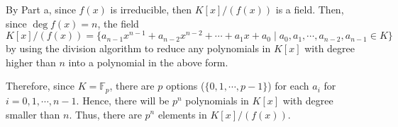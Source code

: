 \begin{answer}
    By Part a, since $f(x)$ is irreducible, then $K[x]/(f(x))$ is a field. Then, since $\deg f(x) = n$, the field
    \begin{equation}
        K[x]/(f(x)) = \{a_{n-1}x^{n-1}+a_{n-2}x^{n-2}+\cdots+a_1x+a_0 \mid a_0,a_1,\cdots,a_{n-2},a_{n-1} \in K\}
    \end{equation}
    by using the division algorithm to reduce any polynomials in $K[x]$ with degree higher than $n$ into a polynomial in the above form.
    
    Therefore, since $K = \mathbb{F}_p$, there are $p$ options ($\{0,1,\cdots,p-1\}$) for each $a_i$ for $i = 0,1,\cdots,n-1$. Hence, there will be $p^n$ polynomials in $K[x]$ with degree smaller than $n$. Thus, there are $p^n$ elements in $K[x]/(f(x))$.
\end{answer}